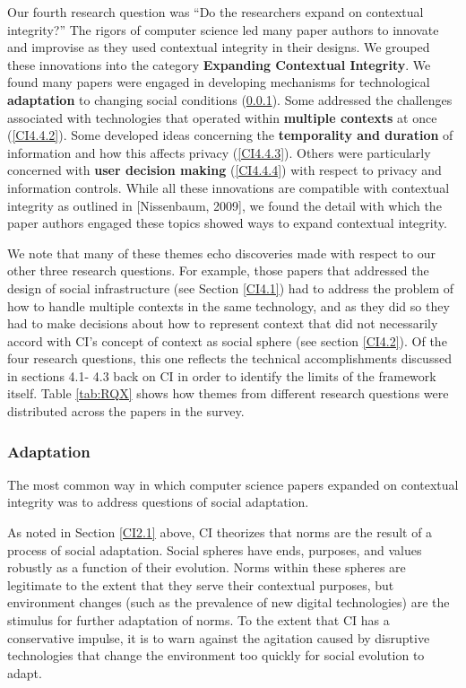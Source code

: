 \documentclass[../thesis.tex]{subfiles}
\begin{document}
Our fourth research question was ``Do the researchers
expand on contextual integrity?'' The rigors of
computer science led many paper authors to innovate and improvise as
they used contextual integrity in their designs. We grouped these
innovations into the category \textbf{Expanding Contextual Integrity}.
We found many papers were engaged in developing mechanisms for
technological \textbf{adaptation} to changing social conditions
(\ref{CI4.4.1}). Some addressed the challenges associated with technologies
that operated within \textbf{multiple contexts} at once (\ref{CI4.4.2}). Some
developed ideas concerning the \textbf{temporality and duration} of
information and how this affects privacy (\ref{CI4.4.3}). Others were
particularly concerned with \textbf{user decision making} (\ref{CI4.4.4}) with
respect to privacy and information controls. While all these
innovations are compatible with contextual integrity as outlined in
[Nissenbaum, 2009], we found the detail with which the paper authors
engaged these topics showed ways to expand contextual integrity.

We note that many of these themes echo discoveries made with respect to
our other three research questions. For example, those papers that
addressed the design of social infrastructure (see Section \ref{CI4.1}) had to
address the problem of how to handle multiple contexts in the same
technology, and as they did so they had to make decisions about how to
represent context that did not necessarily accord with
CI's concept of context as social sphere (see section
\ref{CI4.2}). Of the four research questions, this one reflects the technical
accomplishments discussed in sections 4.1- 4.3 back on CI in order to
identify the limits of the framework itself. Table \ref{tab:RQX} shows how themes
from different research questions were distributed across the papers in
the survey.

\subsubsection{Adaptation}
\label{CI4.4.1}

The most common way in which computer science papers expanded on
contextual integrity was to address questions of social adaptation.

As noted in Section \ref{CI2.1} above, CI theorizes that norms are the result of
a process of social adaptation. Social spheres have ends, purposes, and
values robustly as a function of their evolution. Norms within these
spheres are legitimate to the extent that they serve their contextual
purposes, but environment changes (such as the prevalence of new
digital technologies) are the stimulus for further adaptation of norms.
To the extent that CI has a conservative impulse, it is to warn against
the agitation caused by disruptive technologies that change the
environment too quickly for social evolution to adapt.
\end{document}
